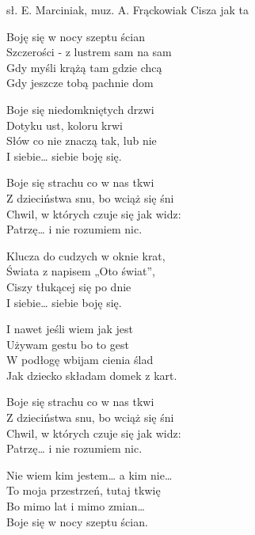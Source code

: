 {sł. E. Marciniak, muz. A. Frąckowiak}
{Cisza jak ta}
\begin{text}
Boję się w nocy szeptu ścian\\
Szczerości - z lustrem sam na sam\\
Gdy myśli krążą tam gdzie chcą\\
Gdy jeszcze tobą pachnie dom

Boje się niedomkniętych drzwi\\
Dotyku ust, koloru krwi\\
Słów co nie znaczą tak, lub nie\\
I siebie… siebie boję się.

Boje się strachu co w nas tkwi\\
Z dzieciństwa snu, bo wciąż się śni\\
Chwil, w których czuje się jak widz:\\
Patrzę… i nie rozumiem nic.

Klucza do cudzych w oknie krat,\\
Świata z napisem „Oto świat”,\\
Ciszy tłukącej się po dnie\\
I siebie… siebie boję się.

I nawet jeśli wiem jak jest\\
Używam gestu bo to gest\\
W podłogę wbijam cienia ślad\\
Jak dziecko składam domek z kart.

Boje się strachu co w nas tkwi\\
Z dzieciństwa snu, bo wciąż się śni\\
Chwil, w których czuje się jak widz:\\
Patrzę… i nie rozumiem nic.

Nie wiem kim jestem… a kim nie…\\
To moja przestrzeń, tutaj tkwię\\
Bo mimo lat i mimo zmian…\\
Boje się w nocy szeptu ścian.
\end{text}
\begin{chord}
\end{chord}
